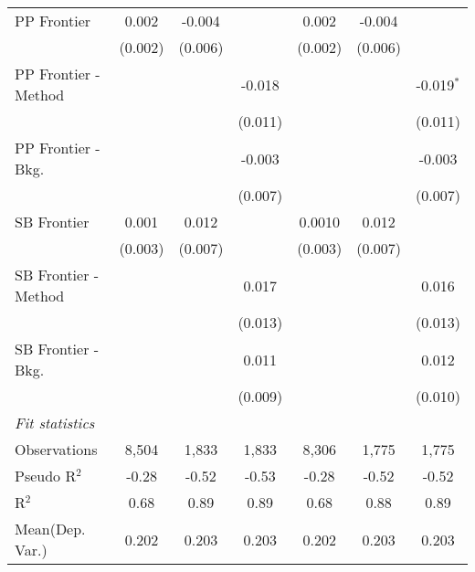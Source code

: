 \begin{tabular}{lcccccc}
   PP Frontier          & 0.002         & -0.004       &              & 0.002         & -0.004       &   \\   
                        & (0.002)       & (0.006)      &              & (0.002)       & (0.006)      &   \\   
   PP Frontier - Method &               &              & -0.018       &               &              & -0.019$^{*}$\\   
                        &               &              & (0.011)      &               &              & (0.011)\\   
   PP Frontier - Bkg.   &               &              & -0.003       &               &              & -0.003\\   
                        &               &              & (0.007)      &               &              & (0.007)\\   
   SB Frontier          & 0.001         & 0.012        &              & 0.0010        & 0.012        &   \\   
                        & (0.003)       & (0.007)      &              & (0.003)       & (0.007)      &   \\   
   SB Frontier - Method &               &              & 0.017        &               &              & 0.016\\   
                        &               &              & (0.013)      &               &              & (0.013)\\   
   SB Frontier - Bkg.   &               &              & 0.011        &               &              & 0.012\\   
                        &               &              & (0.009)      &               &              & (0.010)\\   
   \midrule
   \emph{Fit statistics}\\
   Observations         & 8,504         & 1,833        & 1,833        & 8,306         & 1,775        & 1,775\\  
   Pseudo R$^2$         & -0.28         & -0.52        & -0.53        & -0.28         & -0.52        & -0.52\\  
   R$^2$                & 0.68          & 0.89         & 0.89         & 0.68          & 0.88         & 0.89\\  
Mean(Dep. Var.) & 0.202 & 0.203 & 0.203 & 0.202 & 0.203 & 0.203 \\
   

\end{tabular}
